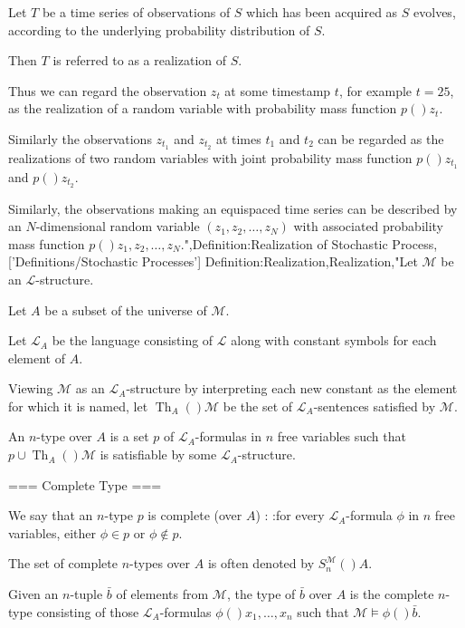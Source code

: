 Let $T$ be a time series of observations of $S$ which has been acquired as $S$ evolves, according to the underlying probability distribution of $S$.


Then $T$ is referred to as a realization of $S$.


Thus we can regard the observation $z_t$ at some timestamp $t$, for example $t = 25$, as the realization of a random variable with probability mass function $p \left(   \right){z_t}$.

Similarly the observations $z_{t_1}$ and $z_{t_2}$ at times $t_1$ and $t_2$ can be regarded as the realizations of two random variables with joint probability mass function $p \left(   \right){z_{t_1} }$ and $p \left(   \right){z_{t_2} }$.


Similarly, the observations making an equispaced time series can be described by an $N$-dimensional random variable $\left( z_1, z_2, \dotsc, z_N \right)$ with associated probability mass function $p \left(   \right){z_1, z_2, \dotsc, z_N}$.",Definition:Realization of Stochastic Process,['Definitions/Stochastic Processes']
Definition:Realization,Realization,"Let $\mathcal M$ be an $\mathcal L$-structure.

Let $A$ be a subset of the universe of $\mathcal M$.

Let $\mathcal L_A$ be the language consisting of $\mathcal L$ along with constant symbols for each element of $A$.

Viewing $\mathcal M$ as an $\mathcal L_A$-structure by interpreting each new constant as the element for which it is named, let $\operatorname {Th}_A \left(   \right)\mathcal M$ be the set of $\mathcal L_A$-sentences satisfied by $\mathcal M$.


An $n$-type over $A$ is a set $p$ of $\mathcal L_A$-formulas in $n$ free variables such that $p \cup \operatorname {Th}_A \left(   \right)\mathcal M$ is satisfiable by some $\mathcal L_A$-structure.




=== Complete Type ===

We say that an $n$-type $p$ is complete (over $A$) :
:for every $\mathcal L_A$-formula $\phi$ in $n$ free variables, either $\phi \in p$ or $\phi \notin p$.


The set of complete $n$-types over $A$ is often denoted by $S_n^\mathcal M \left(   \right)A$.


Given an $n$-tuple $\bar b$ of elements from $\mathcal M$, the type of $\bar b$ over $A$ is the complete $n$-type consisting of those $\mathcal L_A$-formulas $\phi \left(   \right){x_1, \dotsc, x_n}$ such that $\mathcal M \models \phi \left(   \right){\bar b}$.

